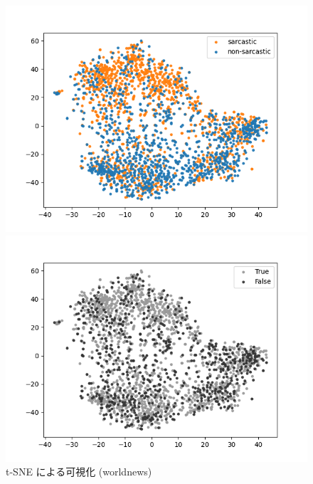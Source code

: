 \begin{figure}[tb]
\begin{center}
 	\begin{minipage}{0.4\hsize}
	\begin{center}
\includegraphics[width=\linewidth]{./figure/tsne_sarc_world.png}
	\end{center}
	\end{minipage}
 	\begin{minipage}{0.4\hsize}
	\begin{center}
\includegraphics[width=\linewidth]{./figure/tsne_TorF_world.png}
 	 \end{center}
 	\end{minipage}
	\caption{t-SNE による可視化 (worldnews)}
	\label{fig:40_tsne3}
\end{center}
\end{figure}

